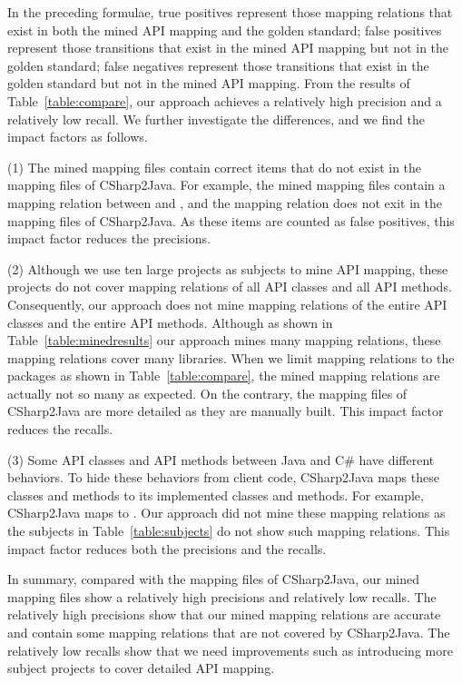 In the preceding formulae, true positives represent those mapping
relations that exist in both the mined API mapping and the golden
standard; false positives represent those transitions that exist in
the mined API mapping but not in the golden standard; false
negatives represent those transitions that exist in the golden
standard but not in the mined API mapping. From the results of
Table~\ref{table:compare}, our approach achieves a relatively high
precision and a relatively low recall. We further investigate the
differences, and we find the impact factors as follows.

(1) The mined mapping files contain correct items that do not exist
in the mapping files of CSharp2Java. For example, the mined mapping
files contain a mapping relation between 
and , and the mapping relation does
not exit in the mapping files of CSharp2Java. As these items are
counted as false positives, this impact factor reduces the
precisions.

(2) Although we use ten large projects as subjects to mine API
mapping, these projects do not cover mapping relations of all API
classes and all API methods. Consequently, our approach does not
mine mapping relations of the entire API classes and the entire API
methods. Although as shown in Table~\ref{table:minedresults} our
approach mines many mapping relations, these mapping relations cover
many libraries. When we limit mapping relations to the packages as
shown in Table~\ref{table:compare}, the mined mapping relations are
actually not so many as expected. On the contrary, the mapping files
of CSharp2Java are more detailed as they are manually built. This
impact factor reduces the recalls.

(3) Some API classes and API methods between Java and C\# have
different behaviors. To hide these behaviors from client code,
CSharp2Java maps these classes and methods to its implemented
classes and methods. For example, CSharp2Java maps
 to
. Our approach did not
mine these mapping relations as the subjects in
Table~\ref{table:subjects} do not show such mapping relations. This
impact factor reduces both the precisions and the recalls.

In summary, compared with the mapping files of CSharp2Java, our
mined mapping files show a relatively high precisions and relatively
low recalls. The relatively high precisions show that our mined
mapping relations are accurate and contain some mapping relations
that are not covered by CSharp2Java. The relatively low recalls show
that we need improvements such as introducing more subject projects
to cover detailed API mapping.

